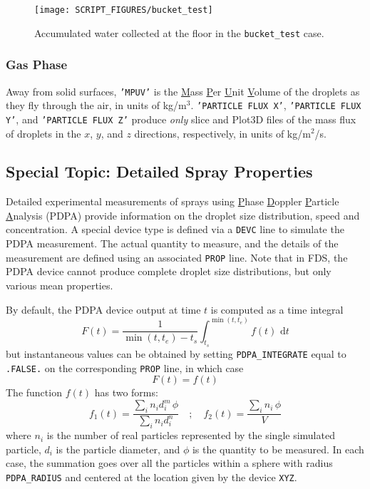 \documentclass[11pt]{book}
\newcommand{\ct}{\tt\small}
\renewcommand{\d}{\,\mathrm{d}}
\newcommand{\be}{\begin{equation}}
\newcommand{\ee}{\end{equation}}
\begin{document}
\begin{figure}[ht]
\centering
\texttt{[image: SCRIPT\_FIGURES/bucket\_test]}
\caption[Results of the {\ct bucket\_test} case]{Accumulated water collected at the floor in the {\ct bucket\_test} case.}
\label{bucket_test_fig}
\end{figure}


\subsubsection{Gas Phase}

Away from solid surfaces, {\ct 'MPUV'} is the \underline{M}ass \underline{P}er \underline{U}nit \underline{V}olume of the droplets as they fly through
the air, in units of kg/m$^3$.  {\ct 'PARTICLE FLUX X'},  {\ct 'PARTICLE FLUX Y'}, and {\ct 'PARTICLE FLUX Z'} produce {\em only} slice and Plot3D files
of the mass flux of droplets in the $x$, $y$, and $z$ directions, respectively, in units of kg/m$^2$/s.



\subsection{Special Topic: Detailed Spray Properties}
\label{PDPA}

Detailed experimental measurements of sprays using \underline{P}hase \underline{D}oppler \underline{P}article
\underline{A}nalysis (PDPA) provide information on the droplet size distribution, speed and concentration.
A special device type is defined via a {\ct DEVC} line to simulate the PDPA measurement. The actual quantity to measure, and the details of the
measurement are defined using an associated {\ct PROP} line. Note that in FDS, the PDPA device cannot produce complete droplet size
distributions, but only various mean properties.

By default, the PDPA device output at time $t$ is computed as a time integral
\be
F(t) = \frac{1}{\min(t,t_e)-t_s} \int_{t_s}^{\min(t,t_e)} f(t) \, \d t
\ee
but instantaneous values can be obtained by setting {\ct PDPA\_INTEGRATE} equal to {\ct .FALSE.} on the corresponding {\ct PROP} line, in which case
\be
F(t) = f(t)
\ee
The function $f(t)$ has two forms:
\be
f_1(t) =  \frac{\sum_i n_i d_i^m \, \phi}{\sum_i n_i d_i^n}  \quad ; \quad
f_2(t) = \frac{\sum_i n_i \, \phi}{V}
\ee
where $n_i$ is the number of real particles represented by the single simulated particle, $d_i$
is the particle diameter, and $\phi$ is the quantity to be measured. In each case, the summation goes over all the particles within a sphere
with radius {\ct PDPA\_RADIUS} and centered at the location given by the device {\ct XYZ}.
\end{document}
